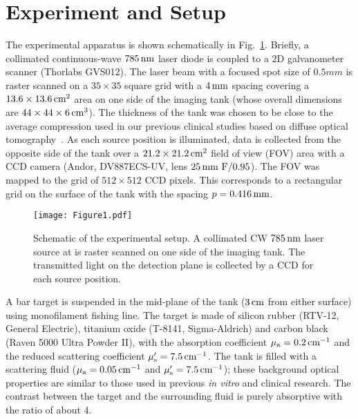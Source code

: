 \section{Experiment and Setup}

The experimental apparatus is shown schematically in Fig.~\ref{fig:schem}.  Briefly, a collimated continuous-wave $785\,{\rm nm}$ laser diode is coupled to a 2D galvanometer scanner (Thorlabs GVS012). The laser beam with a focused spot size of $0.5 mm$ is raster scanned on a $35\times 35$ square grid
with a $4\,{\rm mm}$ spacing covering a $13.6\times 13.6\,{\rm cm}^2$ area on one side of the imaging tank (whose overall dimensions are $44\times 44\times 6\,{\rm cm}^3$). The thickness of the tank was chosen to be close to the average compression used in our previous clinical studies based on diffuse optical tomography~\cite{choe_09_1, culver_03_1}. As each source position is illuminated, data is collected from the opposite side of the tank over a $21.2\times 21.2\,{\rm cm}^2$ field of view (FOV) area with a CCD camera (Andor, DV887ECS-UV, lens $25\,{\rm mm}\ {\rm F}/0.95$). The FOV was mapped to the grid of $512\times 512$ CCD pixels. This corresponds to a rectangular grid on the surface of the tank with the spacing $p=0.416\,{\rm mm}$.

\begin{figure}[t]
\centering\texttt{[image: Figure1.pdf]}
\caption{\label{fig:schem}
Schematic of the experimental setup. A collimated CW $785\,{\rm nm}$ laser source at is raster scanned on one side of the imaging tank. The transmitted light on the detection plane is collected by a CCD for each source position.}
\end{figure}

A bar target is suspended in the mid-plane of the tank ($3\,{\rm cm}$ from either surface) using monofilament fishing line. The target is made of silicon rubber (RTV-12, General Electric), titanium oxide (T-8141, Sigma-Aldrich) and carbon black (Raven 5000 Ultra Powder II), with the absorption coefficient $\mu_{\rm a}=0.2\,{\rm cm}^{-1}$ and the reduced scattering coefficient $\mu_{\rm s}^\prime = 7.5\,{\rm cm}^{-1}$.  The tank is filled with a scattering fluid ($\mu_{\rm a} = 0.05\,{\rm cm}^{-1}$ and $\mu_{\rm s}^\prime = 7.5\,{\rm cm}^{-1}$); these background optical properties are similar to those used in previous {\em in vitro} and clinical research. The contrast between the target and the surrounding fluid is purely absorptive with the ratio of about 4.

